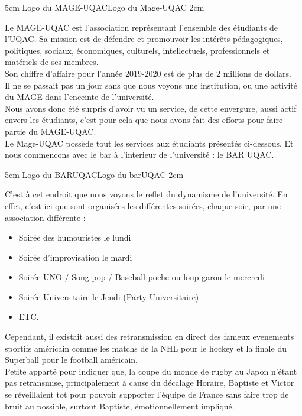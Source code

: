 {5cm}
{Logo du MAGE-UQAC}{Logo du Mage-UQAC}
{2cm}

Le MAGE-UQAC est l’association représentant l’ensemble des étudiants de l’UQAC. Sa mission est de défendre et promouvoir les intérêts pédagogiques, politiques, sociaux, économiques, culturels, intellectuels, professionnels et matériels de ses membres.\\
Son chiffre d'affaire pour l'année 2019-2020 est de plus de 2 millions de dollars.\\

Il ne se passait pas un jour sans que nous voyons une institution, ou une activité du MAGE dans l'enceinte de l'université.\\

Nous avons donc été surpris d'avoir vu un service, de cette envergure, aussi actif envers les étudiants, c'est pour cela que nous avons fait des efforts pour faire partie du MAGE-UQAC.\\

Le Mage-UQAC possède tout les services aux étudiants présentés ci-dessous. Et nous commencons avec le bar à l'interieur de l'université : le BAR UQAC.

{5cm}
{Logo du BARUQAC}{Logo du barUQAC}
{2cm}

C'est à cet endroit que nous voyons le reflet du dynamisme de l'université. En effet, c'est ici que sont organisées les différentes soirées, chaque soir, par une association différente :
\begin{itemize}
    \item Soirée des humouristes le lundi
    \item Soirée d'improvisation le mardi
    \item Soirée UNO / Song pop / Baseball poche ou loup-garou le mercredi
    \item Soirée Universitaire le Jeudi (Party Universitaire)
    \item ETC.
\end{itemize}\leavevmode\newline

Cependant, il existait aussi des retransmission en direct des fameux evenements sportifs américain comme les matchs de la NHL pour le hockey et la finale du Superball pour le football américain.\\

Petite apparté pour indiquer que, la coupe du monde de rugby au Japon n'étant pas retransmise, principalement à cause du décalage Horaire, Baptiste et Victor se réveillaient tot pour pouvoir supporter l'équipe de France sans faire trop de bruit au possible, surtout Baptiste, émotionnellement impliqué.\\

